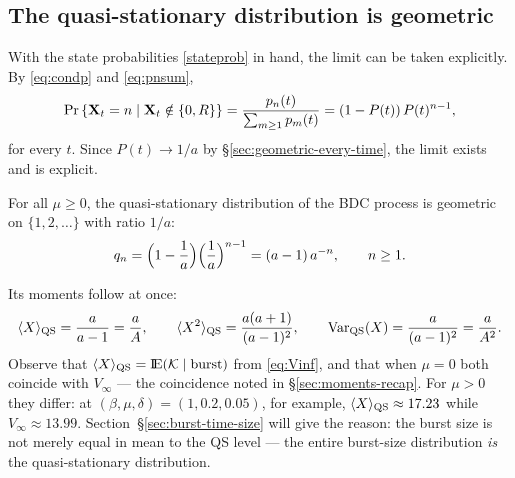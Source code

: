 \subsection{The quasi-stationary distribution is geometric}

With the state probabilities \eqref{stateprob} in hand, the limit can be
taken explicitly. By \eqref{eq:condp} and \eqref{eq:pnsum},
$$
{\text{Pr}\left\{{{\bf X}_t}=n\mid{{\bf X}_t}\notin\{0,R\}\right\}}
=\frac{p_n(t)}{\sum_{m\ge1}p_m(t)}
=\left(1-P(t)\right) P(t)^{n-1},
$$
for every $t$. Since $P(t)\to1/a$ by \S\ref{sec:geometric-every-time}, the
limit exists and is explicit.

\begin{theorem}
\label{thm:qsd}
For all $\mu\ge0$, the quasi-stationary distribution of the BDC process is
geometric on $\{1,2,\ldots\}$ with ratio $1/a$:
\begin{equation}
q_n=\Bigl(1-\frac{1}{a}\Bigr)\Bigl(\frac{1}{a}\Bigr)^{n-1}
=(a-1)\,a^{-n},\qquad n\ge1.
\label{eq:qsd}
\end{equation}
\end{theorem}

Its moments follow at once:
\begin{equation}
\langle X\rangle_{\rm QS}=\frac{a}{a-1}=\frac{a}{A},
\qquad
\langle X^2\rangle_{\rm QS}=\frac{a(a+1)}{(a-1)^2},
\qquad
\mathrm{Var}_{\rm QS}(X)=\frac{a}{(a-1)^2}=\frac{a}{A^2}.
\label{eq:QSmoments}
\end{equation}
Observe that $\langle X\rangle_{\rm QS}={\rm I}\!{\rm E}(\mathcal{K}\mid\text{burst})$ from
\eqref{eq:Vinf}, and that when $\mu=0$ both coincide with $V_\infty$ ---
the coincidence noted in \S\ref{sec:moments-recap}. For $\mu>0$ they differ:
at $(\beta,\mu,\delta)=(1,0.2,0.05)$, for example,
$\langle X\rangle_{\rm QS}\approx17.23$ while $V_\infty\approx13.99$.
Section~\S\ref{sec:burst-time-size} will give the reason: the burst size is
not merely equal in mean to the QS level --- the entire burst-size
distribution \emph{is} the quasi-stationary distribution.

